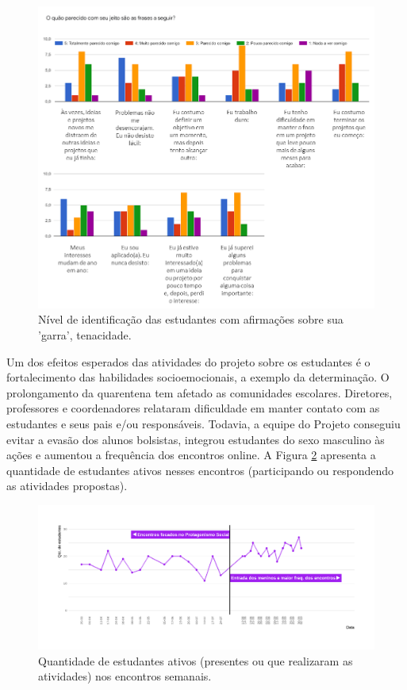\documentclass[
]{book}
\begin{document}
\begin{figure}

{\centering \includegraphics[width=1\linewidth,height=0.8\textheight]{images/image14} 

}

\caption{Nível de identificação das estudantes com afirmações sobre sua 'garra', tenacidade.}\label{fig:nivtena}
\end{figure}

Um dos efeitos esperados das atividades do projeto sobre os estudantes é o fortalecimento das habilidades socioemocionais, a exemplo da determinação. O prolongamento da quarentena tem afetado as comunidades escolares. Diretores, professores e coordenadores relataram dificuldade em manter contato com as estudantes e seus pais e/ou responsáveis. Todavia, a equipe do Projeto conseguiu evitar a evasão dos alunos bolsistas, integrou estudantes do sexo masculino às ações e aumentou a frequência dos encontros online. A Figura \ref{fig:quaseman} apresenta a quantidade de estudantes ativos nesses encontros (participando ou respondendo as atividades propostas).

\begin{figure}

{\centering \includegraphics[width=1\linewidth,height=0.8\textheight]{images/image16} 

}

\caption{Quantidade de estudantes ativos (presentes ou que realizaram as atividades) nos encontros semanais.}\label{fig:quaseman}
\end{figure}
\end{document}
